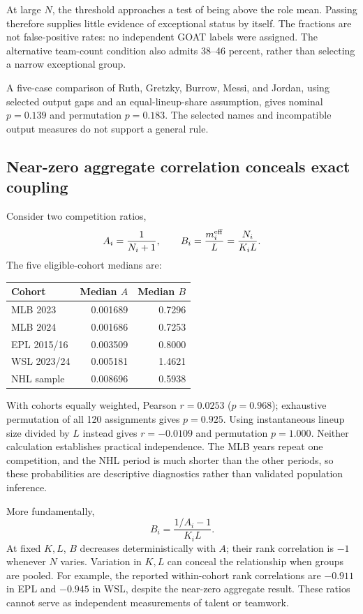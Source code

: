 \documentclass[11pt,letterpaper]{article}
\begin{document}
At large $N$, the threshold approaches a test of being above the role mean.
Passing therefore supplies little evidence of exceptional status by itself.
The fractions are not false-positive rates: no independent GOAT labels were assigned.
The alternative team-count condition also admits 38--46 percent, rather than selecting a narrow exceptional group.

A five-case comparison of Ruth, Gretzky, Burrow, Messi, and Jordan, using selected output gaps and an equal-lineup-share assumption, gives nominal $p=0.139$ and permutation $p=0.183$.
The selected names and incompatible output measures do not support a general rule.

\subsection{Near-zero aggregate correlation conceals exact coupling}

Consider two competition ratios,
\begin{equation}
A_i=\frac{1}{N_i+1},\qquad
B_i=\frac{m_i^{\rm eff}}{L}=\frac{N_i}{K_iL}.
\label{eq:ratios}
\end{equation}
The five eligible-cohort medians are:

\begin{center}
\small
\begin{tabular}{@{}lrr@{}}
\toprule
Cohort & Median $A$ & Median $B$ \\
\midrule
MLB 2023 & 0.001689 & 0.7296 \\
MLB 2024 & 0.001686 & 0.7253 \\
EPL 2015/16 & 0.003509 & 0.8000 \\
WSL 2023/24 & 0.005181 & 1.4621 \\
NHL sample & 0.008696 & 0.5938 \\
\bottomrule
\end{tabular}
\end{center}

With cohorts equally weighted, Pearson $r=0.0253$ ($p=0.968$); exhaustive permutation of all 120 assignments gives $p=0.925$.
Using instantaneous lineup size divided by $L$ instead gives $r=-0.0109$ and permutation $p=1.000$.
Neither calculation establishes practical independence.
The MLB years repeat one competition, and the NHL period is much shorter than the other periods, so these probabilities are descriptive diagnostics rather than validated population inference.

More fundamentally,
\begin{equation}
\boxed{B_i=\frac{1/A_i-1}{K_iL}.}
\label{eq:coupling}
\end{equation}
At fixed $K,L$, $B$ decreases deterministically with $A$; their rank correlation is $-1$ whenever $N$ varies.
Variation in $K,L$ can conceal the relationship when groups are pooled.
For example, the reported within-cohort rank correlations are $-0.911$ in EPL and $-0.945$ in WSL, despite the near-zero aggregate result.
These ratios cannot serve as independent measurements of talent or teamwork.
\end{document}
